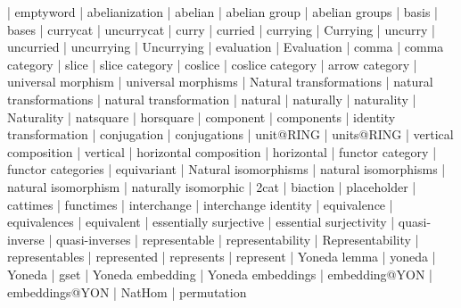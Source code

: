    |   emptyword
    |   abelianization
    |   abelian
    |   abelian group
    |   abelian groups
    |   basis
    |   bases
    |   currycat
    |   uncurrycat
    |   curry
    |   curried
    |   currying
    |   Currying
    |   uncurry
    |   uncurried
    |   uncurrying
    |   Uncurrying
    |   evaluation
    |   Evaluation
    |   comma
    |   comma category
    |   slice
    |   slice category
    |   coslice
    |   coslice category
    |   arrow category
    |   universal morphism
    |   universal morphisms
    |   Natural transformations
    |   natural transformations
    |   natural transformation
    |   natural
    |   naturally
    |   naturality
    |   Naturality
    |   natsquare
    |   horsquare
    |   component
    |   components
    |   identity transformation
    |   conjugation
    |   conjugations
    |   unit@RING
    |   units@RING
    |   vertical composition
    |   vertical
    |   horizontal composition
    |   horizontal
    |   functor category
    |   functor categories
    |   equivariant
    |   Natural isomorphisms
    |   natural isomorphisms
    |   natural isomorphism
    |   naturally isomorphic
    |   2cat
    |   biaction
    |   placeholder
    |   cattimes
    |   functimes
    |   interchange
    |   interchange identity
    |   equivalence
    |   equivalences
    |   equivalent
    |   essentially surjective
    |   essential surjectivity
    |   quasi-inverse
    |   quasi-inverses
    |   representable
    |   representability
    |   Representability
    |   representables
    |   represented
    |   represents
    |   represent
    |   Yoneda lemma
    |   yoneda
    |   Yoneda
    |   gset
    |   Yoneda embedding
    |   Yoneda embeddings
    |   embedding@YON
    |   embeddings@YON
    |   NatHom
    |   permutation
